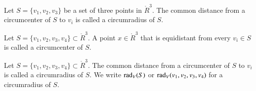 \begin{tarskidata}
\begin{tarski}
\begin{definition}[circumradius]  
Let $S=\{v_1,v_2,v_3\}$ be 
a set of three points in $\ring{R}^3$.
The common distance from a circumcenter of $S$ to $v_i$ is called a
circumradius of $S$.  
\end{definition}
\end{tarski}

\begin{tarski}

\begin{definition}[circumcenter]
Let $S=\{v_1,v_2,v_3,v_4\}\subset \ring{R}^3$.
A point $x\in\ring{R}^3$ 
that is equidistant from every $v_i\in S$ is called a
circumcenter of $S$.  
\end{definition}
\end{tarski}

\begin{tarski}

\begin{definition}  
Let $S=\{v_1,v_2,v_3,v_4\}\subset\ring{R}^3$.
The common distance from a circumcenter of $S$ to $v_i$ is called a
circumradius of $S$.  We write
$\operatorname{rad}_V(S)$ or $\operatorname{rad}_V(v_1,v_2,v_3,v_4)$ for a circumradius of $S$.
\end{definition}
\end{tarski}


\begin{tarski}


\end{tarski}
\end{tarskidata}
